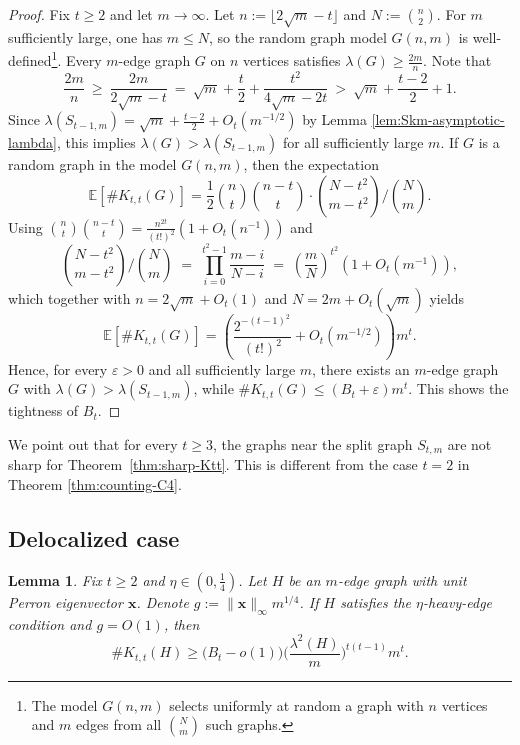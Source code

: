 \documentclass[11pt]{article}
\newtheorem{lemma}[theorem]{Lemma}
\theoremstyle{definition}
\theoremstyle{plain}
\newcommand{\Ktt}{K_{t,t}}
\begin{document}
\begin{proof} 
Fix $t\ge 2$ and let $m\to\infty$.
Let $n:=\lfloor 2\sqrt m-t\rfloor$ and $N:=\binom n2$.
For $m$ sufficiently large, one has $m\le N$, so the random graph model $G(n,m)$ is well-defined\footnote{The model $G(n,m)$ selects uniformly at random a graph with $n$ vertices and $m$ edges from all $\binom{N}{m}$ such graphs.}.
Every $m$-edge graph $G$ on $n$ vertices satisfies $\lambda(G)\ge \frac{2m}{n}$. Note that  
\[
  \frac{2m}{n}
  \ \ge\
  \frac{2m}{2\sqrt m-t}
  \ =\
  \sqrt m+\frac{t}{2}+\frac{t^2}{4\sqrt m-2t}
  \ > \
  \sqrt m+\frac{t-2}{2}+1.
\]
Since $\lambda(S_{t-1,m})=\sqrt m+\frac{t-2}{2}+O_t(m^{-1/2})$ by Lemma \ref{lem:Skm-asymptotic-lambda}, this implies $\lambda(G)>\lambda(S_{t-1,m})$ for all sufficiently
large $m$.
If $G$ is a random graph in the model $G(n,m)$, then the expectation 
\[
\mathbb E[\texttt{\#}\Ktt(G)]
  = 
  \frac12\binom nt\binom{n-t}{t}
  \cdot
  {\binom{N-t^2}{m-t^2}}\bigg/ {\binom{N}{m}}. 
\]
Using $\binom nt\binom{n-t}{t}=\frac{n^{2t}}{(t!)^2}\left(1+O_t(n^{-1})\right)$ and 
\[
  {\binom{N-t^2}{m-t^2}} \bigg/ {\binom{N}{m}}
  \;=\;
  \prod_{i=0}^{t^2-1}\frac{m-i}{N-i}
  \;=\;
  \left(\frac{m}{N}\right)^{t^2}\left(1+O_t(m^{-1})\right), 
\]
which together with $n=2\sqrt m+O_t(1)$ and
$N=2m+O_t(\sqrt m)$ yields 
\[
 \mathbb E[\texttt{\#}\Ktt(G)]
  =
  \left( \frac{2^{-(t-1)^2}}{(t!)^2}+O_t(m^{-1/2})\right)m^t. 
\]  
Hence, for every $\varepsilon>0$ and all sufficiently large $m$, there exists an $m$-edge graph $G$ with
$\lambda(G)>\lambda(S_{t-1,m})$, while $\texttt{\#}\Ktt(G)\le (B_t+\varepsilon)m^t$. This shows the tightness of $B_t$. 
\end{proof}

We point out that for every $t\ge 3$, the graphs near the split graph $S_{t,m}$ are not sharp for Theorem~\ref{thm:sharp-Ktt}.
This is different from the case $t=2$ in Theorem \ref{thm:counting-C4}. 


\subsection{Delocalized case}

\begin{lemma} \label{lem:lemmaB-delocalized}
Fix \(t\ge2\) and $\eta\in(0,\tfrac14)$. Let $H$ be an $m$-edge graph with unit Perron eigenvector \(\bm{x}\). Denote
$g:=\|\bm{x} \|_\infty m^{1/4}$. 
If \(H\) satisfies the \(\eta\)-heavy-edge condition and \(g=O(1)\), then
\[
 \texttt{\#}\Ktt(H)\ge \bigl(B_t-o(1)\bigr) \Big(\frac{\lambda^2(H)}{m}\Big)^{t(t-1)}m^t.
\]
\end{lemma}
\end{document}
